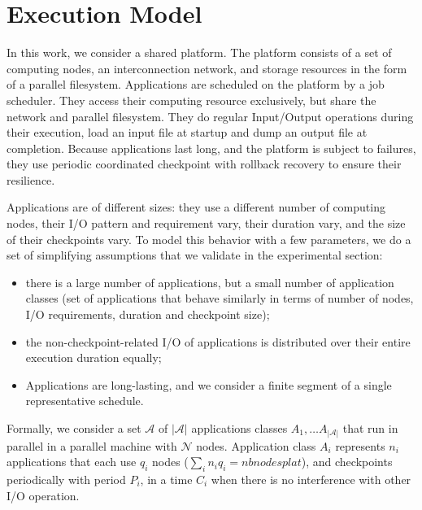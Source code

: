 \documentclass{article}
\newcommand{\appset}{{\mathcal A}}
\newcommand{\nbnodesplat}{{\mathcal N}}
\newcommand{\nbapps}{|{\mathcal A}|}
\newcommand{\app}[1]{A_{#1}}
\newcommand{\nbapp}[1]{n_{#1}}
\newcommand{\nbnodes}[1]{q_{#1}}
\newcommand{\period}[1]{P_{#1}}
\newcommand{\ckpt}[1]{C_{#1}}
\begin{document}
\section{Execution Model}
\label{sec.model}


In this work, we consider a shared platform. The platform consists of
a set of computing nodes, an interconnection network, and storage
resources in the form of a parallel filesystem. Applications are
scheduled on the platform by a job scheduler. They access their
computing resource exclusively, but share the network and parallel
filesystem. They do regular Input/Output operations during their
execution, load an input file at startup and dump an output file at
completion. Because applications last long, and the platform is
subject to failures, they use periodic coordinated checkpoint with
rollback recovery to ensure their resilience.

Applications are of different sizes: they use a different number of
computing nodes, their I/O pattern and requirement vary, their
duration vary, and the size of their checkpoints vary. To model this
behavior with a few parameters, we do a set of simplifying assumptions
that we validate in the experimental section:
\begin{itemize}
  \item there is a large number of applications, but a small number of
    application classes (set of applications that behave similarly in
    terms of number of nodes, I/O requirements, duration and
    checkpoint size);
  \item the non-checkpoint-related I/O of applications is distributed
    over their entire execution duration equally;
  \item Applications are long-lasting, and we consider a finite
    segment of a single representative schedule.
\end{itemize}

Formally, we consider a set $\appset$ of $\nbapps$ applications
classes $\app{1}, \ldots \app{\nbapps}$ that run in parallel in a
parallel machine with $\nbnodesplat$ nodes. Application class
$\app{i}$ represents $\nbapp{i}$ applications that each use
$\nbnodes{i}$ nodes
($\sum_{i}\nbapp{i} \nbnodes{i} = nbnodesplat$), and checkpoints
periodically with period $\period{i}$, in a time $\ckpt{i}$ when there
is no interference with other I/O operation.
\end{document}
